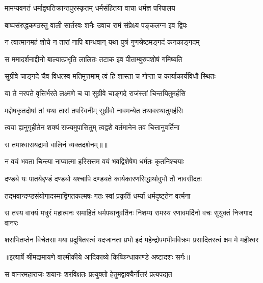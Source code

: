 \twolineshloka
{मामप्यवगतं धर्माद्व्यतिक्रान्तपुरस्कृतम्}
{धर्मसंहितया वाचा धर्मज्ञ परिपालय} %

\twolineshloka
{बाष्पसंरुद्धकण्ठस्तु वाली सार्तरवः शनैः}
{उवाच रामं संप्रेक्ष्य पङ्कलग्न इव द्विपः} %

\twolineshloka
{न त्वात्मानमहं शोचे न तारां नापि बान्धवान्}
{यथा पुत्रं गुणश्रेष्ठमङ्गदं कनकाङ्गदम्} %

\twolineshloka
{स ममादर्शनाद्दीनो बाल्यात्प्रभृति लालितः}
{तटाक इव पीताम्बुरुपशोषं गमिष्यति} %

\twolineshloka
{सुग्रीवे चाङ्गदे चैव विधत्स्व मतिमुत्तमाम्}
{त्वं हि शास्ता च गोप्ता च कार्याकार्यविधौ स्थितः} %

\twolineshloka
{या ते नरपते वृत्तिर्भरते लक्ष्मणे च या}
{सुग्रीवे चाङ्गदे राजंस्तां चिन्तयितुमर्हसि} %

\twolineshloka
{मद्दोषकृतदोषां तां यथा तारां तपस्विनीम्}
{सुग्रीवो नावमन्येत तथावस्थातुमर्हसि} %

\twolineshloka
{त्वया ह्यनुगृहीतेन शक्यं राज्यमुपासितुम्}
{त्वद्वशे वर्तमानेन तव चित्तानुवर्तिना} %

{स तमाश्वासयद्रामो वालिनं व्यक्तदर्शनम्॥॥} %

\addtocounter{shlokacount}{1}

\twolineshloka
{न वयं भवता चिन्त्या नाप्यात्मा हरिसत्तम}
{वयं भवद्विशेषेण धर्मतः कृतनिश्चयाः} %

\twolineshloka
{दण्ड्ये यः पातयेद्दण्डं दण्ड्यो यश्चापि दण्ड्यते}
{कार्यकारणसिद्धार्थावुभौ तौ नावसीदतः} %

\twolineshloka
{तद्भवान्दण्डसंयोगादस्माद्विगतकल्मषः}
{गतः स्वां प्रकृतिं धर्म्यां धर्मदृष्ट्तेन वर्त्मना} %

\fourlineindentedshloka
{स तस्य वाक्यं मधुरं महात्मनः}
{ समाहितं धर्मपथानुवर्तिनः}
{निशम्य रामस्य रणावमर्दिनो}
{ वचः सुयुक्तं निजगाद वानरः} %

\fourlineindentedshloka
{शराभितप्तेन विचेतसा मया}
{ प्रदूषितस्त्वं यदजानता प्रभो}
{इदं महेन्द्रोपमभीमविक्रम}
{ प्रसादितस्त्वं क्षम मे महीश्वर} %


{॥इत्यार्षे श्रीमद्रामायणे वाल्मीकीये आदिकाव्ये किष्किन्धाकाण्डे अष्टादशः सर्गः॥}


\twolineshloka
{स वानरमहाराजः शयानः शरविक्षतः}
{प्रत्युक्तो हेतुमद्वाक्यैर्नोत्तरं प्रत्यपद्यत} %

